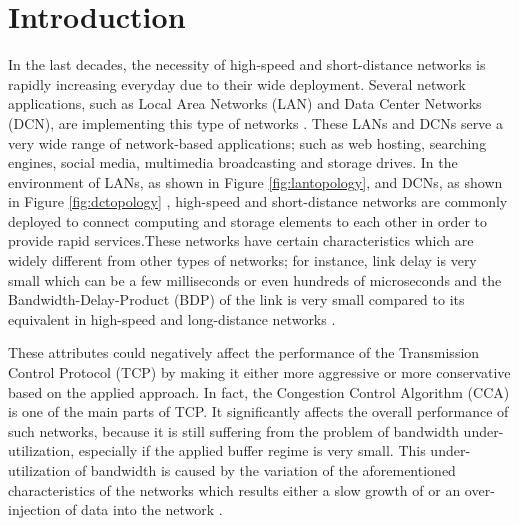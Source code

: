 \documentclass[preprint,3p,times,twocolumn,authoryear]{elsarticle}
\begin{document}






\section{Introduction}
\label{Intro}
In the last decades, the necessity of high-speed and short-distance networks is rapidly increasing everyday due to their wide deployment. Several network applications, such as Local Area Networks (LAN) and Data Center Networks (DCN), are implementing this type of networks \citep{Buyya2008, Armbrust2010}. These LANs and DCNs serve a very wide range of network-based applications; such as web hosting, searching engines, social media, multimedia broadcasting and storage drives. In the environment of LANs, as shown in Figure \ref{fig:lantopology}, and DCNs, as shown in Figure \ref{fig:dctopology} \citep{Alfares2010, Wu2012, Yoo2012, prakash2012}, high-speed and short-distance networks are commonly deployed to connect computing and storage elements to each other in order to provide rapid services.These networks have certain characteristics which are widely different from other types of networks; for instance, link delay is very small which can be a few milliseconds or even hundreds of microseconds and the Bandwidth-Delay-Product (BDP) of the link is very small compared to its equivalent in high-speed and long-distance networks \citep{Tahiliani2012, Vasudevan2009}.

These attributes could negatively affect the performance of the Transmission Control Protocol (TCP) by making it either more aggressive or more conservative based on the applied approach. In fact, the Congestion Control Algorithm (CCA) is one of the main parts of TCP. It significantly affects the overall performance of such networks, because it is still suffering from the problem of bandwidth under-utilization, especially if the applied buffer regime is very small. This under-utilization of bandwidth is caused by the variation of the aforementioned characteristics of the networks which results either a slow growth of  or an over-injection of data into the network \citep{Afanasyev2010, Scharf2011, Callegari2012b, Callegari2014, Lar2013, acharya2012, alrshah2014}.
\end{document}
